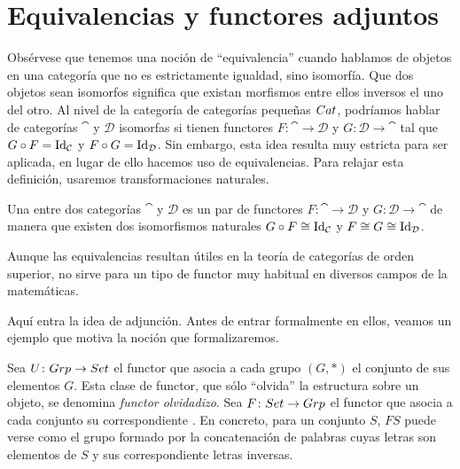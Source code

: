 \section{Equivalencias y functores adjuntos}\label{functores-adjuntos}
Obsérvese que tenemos una noción de ``equivalencia'' cuando hablamos de objetos en una categoría que no es estrictamente igualdad, sino isomorfía.
Que dos objetos sean isomorfos significa que existan morfismos entre ellos inversos el uno del otro.
Al nivel de la categoría de categorías pequeñas ${Cat}$, podríamos hablar de categorías $\cat$ y $\mathcal{D}$ isomorfas si tienen functores $F \colon \cat \to \mathcal{D}$ y $G \colon \mathcal{D} \to \cat$ tal que $G \circ F = \operatorname{Id}_{\mathcal{C}}$ y $F \circ G = \operatorname{Id}_\mathcal{D}$.
Sin embargo, esta idea resulta muy estricta para ser aplicada, en lugar de ello hacemos uso de equivalencias.
Para relajar esta definición, usaremos transformaciones naturales.

\begin{definition}
Una  entre dos categorías $\cat$ y $\mathcal{D}$ es un par de functores $F \colon \cat \to \mathcal{D}$ y $G \colon \mathcal{D} \to \cat$ de manera que existen dos isomorfismos naturales $G \circ F \cong \operatorname{Id}_{\mathcal{C}}$ y $F \cong G \cong \operatorname{Id}_\mathcal{D}$.
\end{definition}

Aunque las equivalencias resultan útiles en la teoría de categorías de orden superior, no sirve para un tipo de functor muy habitual en diversos campos de la matemáticas.

Aquí entra la idea de adjunción.
Antes de entrar formalmente en ellos, veamos un ejemplo que motiva la noción que formalizaremos.



Sea $U \colon {Grp} \to {Set}$ el functor que asocia a cada grupo $(G,*)$ el conjunto de sus elementos $G$.
Esta clase de functor, que sólo ``olvida'' la estructura sobre un objeto, se denomina \emph{functor olvidadizo}.
Sea $F \colon {Set} \to {Grp}$ el functor que asocia a cada conjunto su correspondiente .
En concreto, para un conjunto $S$, $F S$ puede verse como el grupo formado por la concatenación de palabras cuyas letras son elementos de $S$ y sus correspondiente letras inversas.

